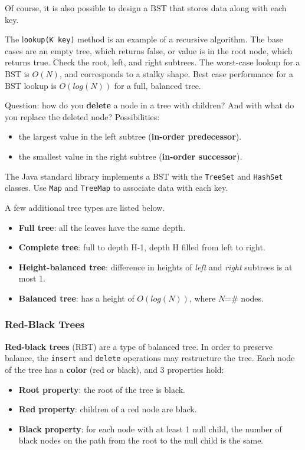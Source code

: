 Of course, it is also possible to design a BST that stores data along with each key. 

The l\texttt{ookup(K key)} method is an example of a recursive algorithm. The base cases are an empty tree, which returns false, or value is in the root node, which returns true. Check the root, left, and right subtrees. The worst-case lookup for a BST is $O(N)$, and corresponds to a stalky shape. Best case performance for a BST lookup is $O(log(N))$ for a full, balanced tree. 

Question: how do you \textbf{delete} a node in a tree with children? And with what do you replace the deleted node? Possibilities:
\begin{itemize}
	\item the largest value in the left subtree (\textbf{in-order predecessor}). 
	\item the smallest value in the right subtree (\textbf{in-order successor}). 
\end{itemize}

The Java standard library implements a BST with the \texttt{TreeSet} and \texttt{HashSet} classes. Use \texttt{Map} and \texttt{TreeMap} to associate data with each key. 

A few additional tree types are listed below.

\begin{itemize} 
	\item \textbf{Full tree}: all the leaves have the same depth. 
	\item \textbf{Complete tree}: full to depth H-1, depth H filled from left to right. 
	\item \textbf{Height-balanced tree}: difference in heights of \textit{left} and \textit{right} subtrees is at most 1. 
	\item \textbf{Balanced tree}: has a height of $O(log(N))$, where $N$=\# nodes.
\end{itemize}

\subsubsection{Red-Black Trees}

\textbf{Red-black trees} (RBT) are a type of balanced tree. In order to preserve balance, the \texttt{insert} and \texttt{delete} operations may restructure the tree. Each node of the tree has a \textbf{color} (red or black), and 3 properties hold:

\begin{itemize}
	\item \textbf{Root property}: the root of the tree is black.
	\item \textbf{Red property}: children of a red node are black. 
	\item \textbf{Black property}: for each node with at least 1 null child, the number of black nodes on the path from the root to the null child is the same. 
\end{itemize}

